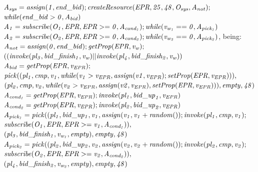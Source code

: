 \noindent ${\it A_{sys}=assign(1,end\_bid);createResource(EPR,25,48,O_{sys},A_{not});}$ \\ \indent \hspace{0.35cm} ${\it while(end\_bid > 0,A_{bid})}$\\
${\it A_1=subscribe(O_1,EPR,EPR>=0,A_{cond_{1}});while(v_{w{_1}}==0,A_{pick_{1}})}$\\
${\it A_2=subscribe(O_2,EPR,EPR>=0,A_{cond_{2}});while(v_{w{_2}}==0,A_{pick_{2}})}$, being:\\
${\it A_{not}=assign(0,end\_bid);getProp(EPR,v_w);}$\\
\indent \hspace{0.35cm} ${\it((invoke(pl_3,bid\_finish_1,v_w)||invoke(pl_4,bid\_finish_2,v_w))}$\\
${\it A_{bid}=getProp(EPR,v_{EPR});}$ \\
\indent  \hspace{0.35cm} ${\it  pick((pl_1,cmp,v_1,while(v_1>v_{EPR},assign(v1,v_{EPR});setProp(EPR,v_{EPR}))),}$ \\ \indent ${\it (pl_2,cmp,v_2,while(v_2>v_{EPR},assign(v2,v_{EPR}),setProp(EPR,v_{EPR}))),%
empty,48)}$\\
${\it A_{cond_{1}}=getProp(EPR,v_{EPR});invoke(pl_1,{bid\_up}_1,v_{EPR})}$\\
${\it A_{cond_{2}}=getProp(EPR,v_{EPR});invoke(pl_2,{bid\_up}_2,v_{EPR})}$\\
${\it A_{pick_{1}}= pick((pl_1,bid\_up_1,v_1,assign(v_1,v_1+random());invoke(pl_1,cmp,v_1);}$ \\\indent \hspace{0.35cm}${\it subscribe(O_1,EPR,EPR>=v_1,A_{cond_{1}})),}$
${\it(pl_3,bid\_finish_1,v_{w_1},empty),empty,48)}$\\
${\it A_{pick_{2}}= pick((pl_2,bid\_up_2,v_2,assign(v_2,v_2+random());invoke(pl_2,cmp,v_2);} $\\\indent \hspace{0.35cm}${\it  subscribe(O_2,EPR,EPR>=v_2,A_{cond_{2}})),}$
${\it(pl_4,bid\_finish_2,v_{w_2},empty),empty,48)}$\\
\\

